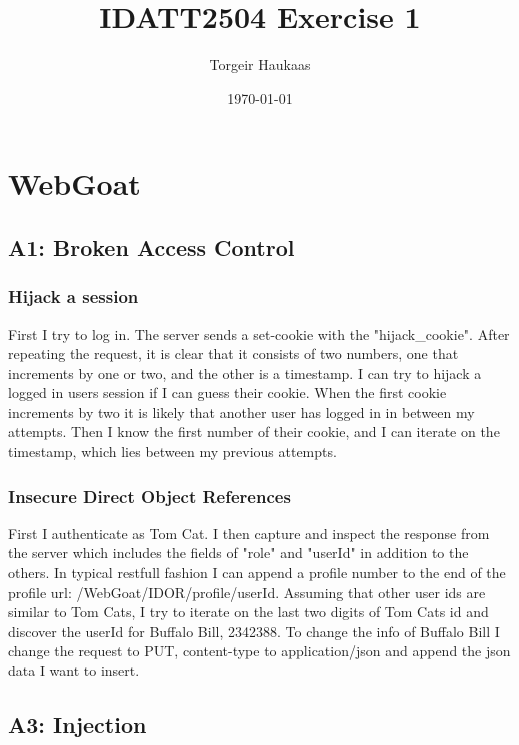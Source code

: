 \documentclass[11pt,a4paper]{report}
\title{IDATT2504 Exercise 1}
\author{Torgeir Haukaas}
\date{\today}
\begin{document}
\maketitle

\section{WebGoat}
\subsection{A1: Broken Access Control}
\subsubsection{Hijack a session}

First I try to log in. The server sends a set-cookie with the "hijack\_cookie".
After repeating the request, it is clear that it consists of two numbers, one 
that increments by one or two, and the other is a timestamp. I can try to 
hijack a logged in users session if I can guess their cookie. When the first 
cookie increments by two it is likely that another user has logged in in 
between my attempts. Then I know the first number of their cookie, and I can 
iterate on the timestamp, which lies between my previous attempts.

\subsubsection{Insecure Direct Object References}

First I authenticate as Tom Cat. I then capture and inspect the response from
the server which includes the fields of "role" and "userId" in addition to the
others. In typical restfull fashion I can append a profile number to the end of
the profile url: /WebGoat/IDOR/profile/userId. Assuming that other user ids are
similar to Tom Cats, I try to iterate on the last two digits of Tom Cats id and
discover the userId for Buffalo Bill, 2342388. To change the info of Buffalo Bill
I change the request to PUT, content-type to application/json and append the 
json data I want to insert.

\subsection{A3: Injection}
\end{document}
